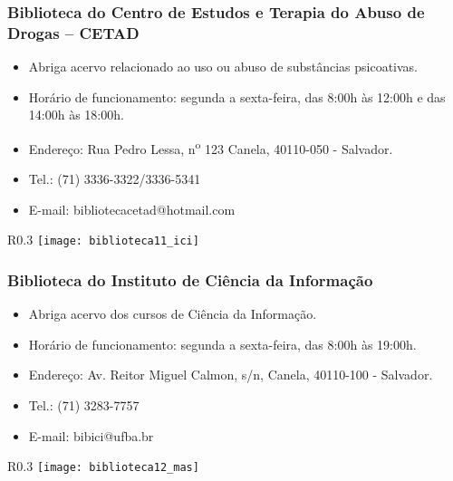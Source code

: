     \subsubsection{Biblioteca do Centro de Estudos e Terapia do Abuso de Drogas – CETAD}
        \begin{itemize}
            \item Abriga acervo relacionado ao uso ou abuso de substâncias psicoativas.
            \item Horário de funcionamento: segunda a sexta-feira, das 8:00h às 12:00h e das 14:00h às 18:00h.
            \item Endereço: Rua Pedro Lessa, n\textsuperscript{o} 123 Canela, 40110-050 - Salvador.
            \item Tel.: (71) 3336-3322/3336-5341
            \item E-mail: bibliotecacetad@hotmail.com
        \end{itemize}
        \begin{wrapfigure}{R}{0.3\textwidth}
            \centering
            \texttt{[image: biblioteca11\_ici]}
        \end{wrapfigure}
        
    \subsubsection{Biblioteca do Instituto de Ciência da Informação}
        \begin{itemize}
            \item Abriga acervo dos cursos de Ciência da Informação.
            \item Horário de funcionamento: segunda a sexta-feira, das 8:00h às 19:00h.
            \item Endereço: Av. Reitor Miguel Calmon, s/n, Canela, 40110-100 - Salvador.
            \item Tel.: (71) 3283-7757
            \item E-mail: bibici@ufba.br
        \end{itemize}
        \begin{wrapfigure}{R}{0.3\textwidth}
            \centering
            \texttt{[image: biblioteca12\_mas]}
        \end{wrapfigure}
